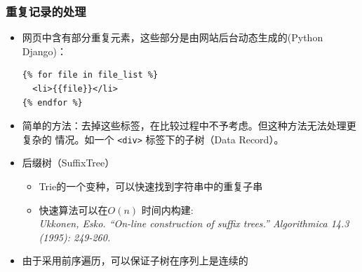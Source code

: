 \documentclass[11pt,presentation]{beamer}
\begin{document}
\begin{frame}[fragile]
\frametitle{重复记录的处理}
\label{sec-2-8}

\begin{itemize}
\item 网页中含有部分重复元素，这些部分是由网站后台动态生成的(Python Django)：

\lstset{extendedchars=false,basicstyle=\ttfamily\footnotesize,escapechar=`,breaklines,language=Python}
\begin{lstlisting}
{% for file in file_list %}
  <li>{{file}}</li>
{% endfor %}
\end{lstlisting}
\item 简单的方法：去掉这些标签，在比较过程中不予考虑。但这种方法无法处理更复杂的
     情况。如一个 \texttt{<div>} 标签下的子树（Data Record）。
\item 后缀树（SuffixTree）
\begin{itemize}
\item Trie的一个变种，可以快速找到字符串中的重复子串
\item 快速算法可以在\(O(n)\) 时间内构建: \\\footnotesize\em
       Ukkonen, Esko. ``On-line construction of suffix trees.'' Algorithmica 14.3
       (1995): 249-260.
\end{itemize}
\item 由于采用前序遍历，可以保证子树在序列上是连续的
\end{itemize}
\end{frame}
\end{document}
